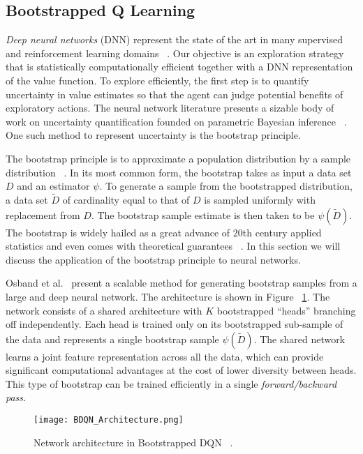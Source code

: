 \subsection{Bootstrapped Q Learning}
\emph{Deep neural networks} (DNN) represent the state of the art in many supervised and reinforcement learning domains ~\cite{mnih2015humanlevel}. Our objective is an exploration strategy that is statistically computationally efficient together with a DNN representation of the value function. To explore efficiently, the first step is to quantify uncertainty in value estimates so that the agent can judge potential benefits of exploratory actions. The neural network literature presents a sizable body of work on uncertainty quantification founded on parametric Bayesian inference ~\cite{Blundell:2015:WUN:3045118.3045290,Gal:2016:DBA:3045390.3045502}. One such method to represent uncertainty is the bootstrap principle.\par
The bootstrap principle is to approximate a population distribution by a sample distribution ~\cite{EfroTibs93}. In its most common form, the bootstrap takes as input a data set $D$ and an estimator $\psi$. To generate a sample from the bootstrapped distribution, a data set $\widetilde{D}$ of cardinality equal to that of $D$ is sampled uniformly with replacement from $D$. The bootstrap sample estimate is then taken to be
$\psi(\widetilde{D})$. The bootstrap is widely hailed as a great advance of 20th century
applied statistics and even comes with theoretical guarantees ~\cite{bootstrapAsymptotic}. In this section we will discuss the application of the bootstrap principle to neural networks.\par
Osband et al.~\cite{DBLP:journals/corr/OsbandBPR16} present a scalable method for generating bootstrap samples from a large and deep neural network. The architecture is shown in Figure ~\ref{fig:BDQN_Architecture}. The network consists of a shared architecture with $K$ bootstrapped ``heads'' branching off independently. Each head is trained only on its bootstrapped sub-sample of the data and represents a single bootstrap sample $\psi(\widetilde{D})$. The shared network learns a joint feature representation across all the data, which can provide significant computational advantages at the cost of lower diversity between heads. This type of bootstrap can be trained efficiently in a single \emph{forward/backward pass}.
\begin{figure}
 \texttt{[image: BDQN\_Architecture.png]}
 \caption{Network architecture in Bootstrapped DQN ~\cite{DBLP:journals/corr/OsbandBPR16}.}
 \label{fig:BDQN_Architecture}
\end{figure}
